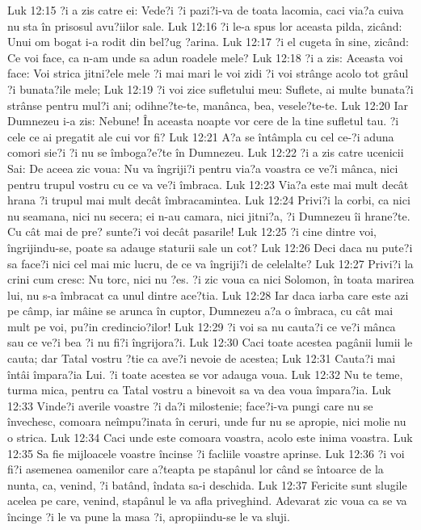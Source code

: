 Luk 12:15  ?i a zis catre ei: Vede?i ?i pazi?i-va de toata lacomia, caci via?a cuiva nu sta în prisosul avu?iilor sale.
Luk 12:16  ?i le-a spus lor aceasta pilda, zicând: Unui om bogat i-a rodit din bel?ug ?arina.
Luk 12:17  ?i el cugeta în sine, zicând: Ce voi face, ca n-am unde sa adun roadele mele?
Luk 12:18  ?i a zis: Aceasta voi face: Voi strica jitni?ele mele ?i mai mari le voi zidi ?i voi strânge acolo tot grâul ?i bunata?ile mele;
Luk 12:19  ?i voi zice sufletului meu: Suflete, ai multe bunata?i strânse pentru mul?i ani; odihne?te-te, manânca, bea, vesele?te-te.
Luk 12:20  Iar Dumnezeu i-a zis: Nebune! În aceasta noapte vor cere de la tine sufletul tau. ?i cele ce ai pregatit ale cui vor fi?
Luk 12:21  A?a se întâmpla cu cel ce-?i aduna comori sie?i ?i nu se îmboga?e?te în Dumnezeu.
Luk 12:22  ?i a zis catre ucenicii Sai: De aceea zic voua: Nu va îngriji?i pentru via?a voastra ce ve?i mânca, nici pentru trupul vostru cu ce va ve?i îmbraca.
Luk 12:23  Via?a este mai mult decât hrana ?i trupul mai mult decât îmbracamintea.
Luk 12:24  Privi?i la corbi, ca nici nu seamana, nici nu secera; ei n-au camara, nici jitni?a, ?i Dumnezeu îi hrane?te. Cu cât mai de pre? sunte?i voi decât pasarile!
Luk 12:25  ?i cine dintre voi, îngrijindu-se, poate sa adauge staturii sale un cot?
Luk 12:26  Deci daca nu pute?i sa face?i nici cel mai mic lucru, de ce va îngriji?i de celelalte?
Luk 12:27  Privi?i la crini cum cresc: Nu torc, nici nu ?es. ?i zic voua ca nici Solomon, în toata marirea lui, nu s-a îmbracat ca unul dintre ace?tia.
Luk 12:28  Iar daca iarba care este azi pe câmp, iar mâine se arunca în cuptor, Dumnezeu a?a o îmbraca, cu cât mai mult pe voi, pu?in credincio?ilor!
Luk 12:29  ?i voi sa nu cauta?i ce ve?i mânca sau ce ve?i bea ?i nu fi?i îngrijora?i.
Luk 12:30  Caci toate acestea pagânii lumii le cauta; dar Tatal vostru ?tie ca ave?i nevoie de acestea;
Luk 12:31  Cauta?i mai întâi împara?ia Lui. ?i toate acestea se vor adauga voua.
Luk 12:32  Nu te teme, turma mica, pentru ca Tatal vostru a binevoit sa va dea voua împara?ia.
Luk 12:33  Vinde?i averile voastre ?i da?i milostenie; face?i-va pungi care nu se învechesc, comoara neîmpu?inata în ceruri, unde fur nu se apropie, nici molie nu o strica.
Luk 12:34  Caci unde este comoara voastra, acolo este inima voastra.
Luk 12:35  Sa fie mijloacele voastre încinse ?i facliile voastre aprinse.
Luk 12:36  ?i voi fi?i asemenea oamenilor care a?teapta pe stapânul lor când se întoarce de la nunta, ca, venind, ?i batând, îndata sa-i deschida.
Luk 12:37  Fericite sunt slugile acelea pe care, venind, stapânul le va afla priveghind. Adevarat zic voua ca se va încinge ?i le va pune la masa ?i, apropiindu-se le va sluji.
